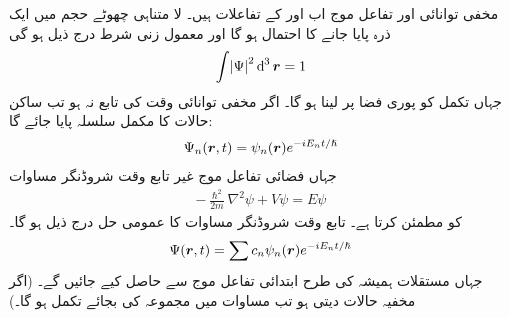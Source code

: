 مخفی توانائی    اور تفاعل موج      اب  اور  کے تفاعلات ہیں۔ لا متناہی چھوٹے حجم   میں ایک ذرہ  پایا جانے کا احتمال
     ہو گا اور معمول زنی شرط درج ذیل ہو گی
\begin{align}\label{مساوات_ابعادی_معمول_زنی_شرط}
\int\abs{\Psi}^{2}\dif^{\,3}\kvec{r}=1 
\end{align}
جہاں تکمل کو پوری فضا پر لینا ہو گا۔ اگر مخفی توانائی وقت کی تابع نہ ہو  تب ساکن حالات کا مکمل سلسلہ پایا جائے گا:
\begin{align}
\Psi_{n}({{\boldsymbol{r}}},t)=\psi_{n}({{\boldsymbol{r}}})e^{-iE_{n}t/\hslash} 
\end{align}
جہاں فضائی تفاعل موج     غیر تابع وقت شروڈنگر مساوات 
\begin{align}
-\frac{\hslash^{2}}{2m}\nabla^{2}\psi+V\psi=E\psi
\end{align}
کو مطمئن کرتا ہے۔ تابع وقت شروڈنگر مساوات کا عمومی حل درج ذیل ہو گا۔
\begin{align}\label{مساوات_ابعادی_عمومی_حل_الف}
\Psi({{\boldsymbol{r}}},t)=\sum c_{n}\psi_{n}({{\boldsymbol{r}}})e^{-iE_{n}t/\hslash} 
\end{align}
جہاں مستقلات   ہمیشہ کی طرح ابتدائی تفاعل موج     سے حاصل کیے جائیں گے۔ (اگر مخفیہ     حالات دیتی ہو تب مساوات  میں مجموعہ کی بجائے تکمل ہو گا۔)


